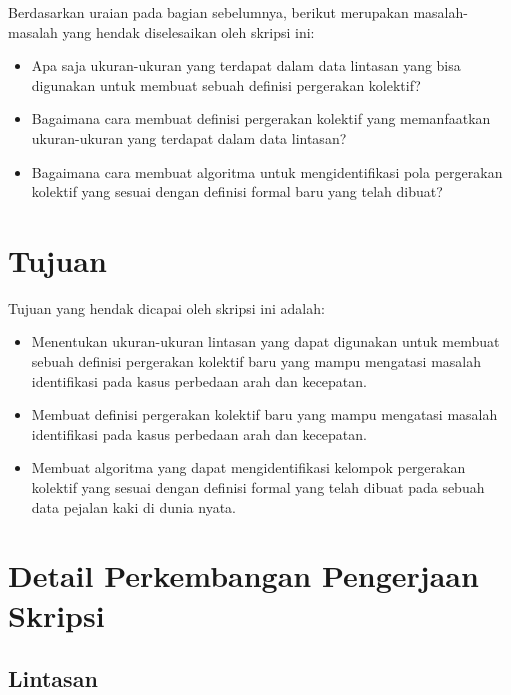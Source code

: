 \documentclass[a4paper,twoside]{article}
\begin{document}
Berdasarkan uraian pada bagian sebelumnya, berikut merupakan masalah-masalah yang hendak diselesaikan oleh skripsi ini:

\begin{itemize}[noitemsep, nolistsep]
    \item Apa saja ukuran-ukuran yang terdapat dalam data lintasan yang bisa digunakan untuk membuat sebuah definisi pergerakan kolektif?
    \item Bagaimana cara membuat definisi pergerakan kolektif yang memanfaatkan ukuran-ukuran yang terdapat dalam data lintasan?
    \item Bagaimana cara membuat algoritma untuk mengidentifikasi pola pergerakan kolektif yang sesuai dengan definisi formal baru yang telah dibuat?
\end{itemize}

\section{Tujuan}

Tujuan yang hendak dicapai oleh skripsi ini adalah:

\begin{itemize}[noitemsep, nolistsep]
    \item Menentukan ukuran-ukuran lintasan yang dapat digunakan untuk membuat sebuah definisi pergerakan kolektif baru yang mampu mengatasi masalah identifikasi pada kasus perbedaan arah dan kecepatan.
    \item Membuat definisi pergerakan kolektif baru yang mampu mengatasi masalah identifikasi pada kasus perbedaan arah dan kecepatan.
    \item Membuat algoritma yang dapat mengidentifikasi kelompok pergerakan kolektif yang sesuai dengan definisi formal yang telah dibuat pada sebuah data pejalan kaki di dunia nyata.
\end{itemize}

\section{Detail Perkembangan Pengerjaan Skripsi}

\subsection{Lintasan}
\end{document}
